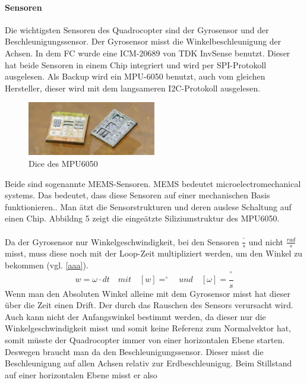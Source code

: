 \documentclass[12pt,a4paper, ngerman]{article}
\begin{document}
\paragraph{Sensoren}
Die wichtigsten Sensoren des Quadrocopter sind der Gyrosensor und der Beschleunigungssensor. Der Gyrosensor misst die Winkelbeschleunigung der Achsen. In dem FC wurde eine ICM-20689 von TDK InvSense benutzt. Dieser hat beide Sensoren in einem Chip integriert und wird per SPI-Protokoll ausgelesen. Als Backup wird ein MPU-6050 benutzt, auch vom gleichen Hersteller, dieser wird mit dem langsameren I2C-Protokoll ausgelesen. \\
\begin{figure}
\centering
\includegraphics[width=0.5\textwidth]{1920px-Mpu6050-HD.jpg}
\caption[\url{https://upload.wikimedia.org/wikipedia/commons/2/27/Mpu6050-HD.jpg}]{Dice des MPU6050}
\end{figure}
Beide sind sogenannte MEMS-Sensoren. MEMS bedeutet microelectromechanical systems. Das bedeutet, dass diese Sensoren auf einer mechanischen Basis funktionieren.\cite{website:elek_Komp_MEMS}. Man ätzt die Sensorstrukturen und deren auslese Schaltung auf einen Chip. Abbildng 5 zeigt die eingeätzte Siliziumstruktur des MPU6050.\\ \\
Da der Gyrosensor nur Winkelgeschwindigkeit, bei den Sensoren $\frac{^\circ}{s}$ und nicht $\frac{rad}{s}$ misst, muss diese noch mit der Loop-Zeit multipliziert werden, um den Winkel zu bekommen (vgl. \ref{aaa}).
\begin{equation}\label{aaa}
w=\omega\cdot dt \quad mit \quad [w]=^\circ \quad und \quad [\omega]=\frac{^\circ}{s}
\end{equation}
Wenn man den Absoluten Winkel alleine mit dem Gyrosensor misst hat dieser über die Zeit einen Drift. Der durch das Rauschen des Sensors verursacht wird. Auch kann nicht der Anfangswinkel bestimmt werden, da dieser nur die Winkelgeschwindigkeit misst und somit keine Referenz zum Normalvektor hat, somit müsste der Quadrocopter immer von einer horizontalen Ebene starten. Deswegen braucht man da den Beschleunigungssensor. Dieser misst die Beschleunigung auf allen Achsen relativ zur Erdbeschleunigug. Beim Stillstand auf einer horizontalen Ebene misst er also
\end{document}
